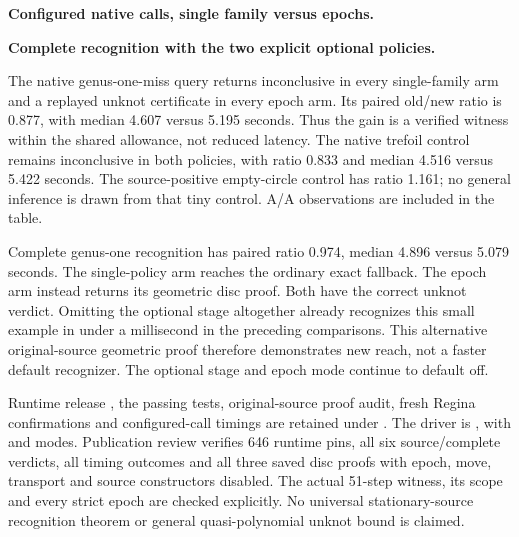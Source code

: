 \textbf{Configured native calls, single family versus epochs.}

\textbf{Complete recognition with the two explicit optional policies.}


The native genus-one-miss query returns inconclusive in every single-family
arm and a replayed unknot certificate in every epoch arm. Its paired old/new
ratio is 0.877, with median 4.607 versus 5.195 seconds. Thus the gain is a
verified witness within the shared allowance, not reduced latency. The
native trefoil control remains inconclusive in both policies, with ratio
0.833 and median 4.516 versus 5.422 seconds. The source-positive empty-circle
control has ratio 1.161; no general inference is drawn from that tiny control.
A/A observations are included in the table.

Complete genus-one recognition has paired ratio 0.974, median 4.896 versus
5.079 seconds. The single-policy arm reaches the ordinary exact fallback.
The epoch arm instead returns its geometric disc proof. Both have the correct
unknot verdict. Omitting the optional stage altogether already recognizes
this small example in under a millisecond in the preceding comparisons.
This alternative original-source geometric proof therefore demonstrates
new reach, not a faster default recognizer. The optional stage and epoch
mode continue to default off.

Runtime release , the passing tests, original-source proof
audit, fresh Regina confirmations and configured-call timings are retained
under . The driver is
, with  and  modes.
Publication review verifies 646 runtime pins, all six source/complete verdicts,
all timing outcomes and all three saved disc proofs with epoch, move,
transport and source constructors disabled. The actual 51-step witness,
its scope and every strict epoch are checked explicitly. No universal
stationary-source recognition theorem or general quasi-polynomial unknot
bound is claimed.
